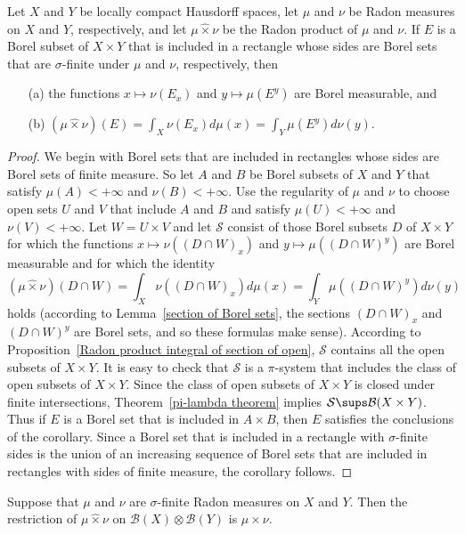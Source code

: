 \begin{proposition}\label{Radon product integral of section of sigma-finite edges}
Let $X$ and $Y$ be locally compact Hausdorff spaces, let $\mu$ and $\nu$ be Radon measures on $X$ and $Y$, respectively, and let $\mu\hat{\times}\nu$ be the Radon product of $\mu$ and $\nu$. If $E$ is a Borel subset of $X\times Y$ that is included in a rectangle whose sides are Borel sets that
are $\sigma$-finite under $\mu$ and $\nu$, respectively, then
\begin{itemize}
\item[(a)] the functions $x\mapsto\nu(E_x)$ and $y\mapsto\mu(E^y)$ are Borel measurable, and
\item[(b)] $(\mu\hat{\times}\nu)(E)=\int_X\nu(E_x)d\mu(x)=\int_Y\mu(E^y)d\nu(y)$.
\end{itemize}
\end{proposition}
\begin{proof}
We begin with Borel sets that are included in rectangles whose sides are
Borel sets of finite measure. So let $A$ and $B$ be Borel subsets of $X$ and $Y$ that satisfy $\mu(A)<+\infty$ and $\nu(B)<+\infty$. Use the regularity of $\mu$ and $\nu$ to choose open sets $U$ and $V$ that include $A$ and $B$ and satisfy $\mu(U)<+\infty$ and $\nu(V)<+\infty$. Let $W=U\times V$ and let $\mathcal{S}$ consist of those Borel subsets $D$ of $X\times Y$ for which the functions $x\mapsto\nu((D\cap W)_x)$ and $y\mapsto\mu((D\cap W)^y)$ are Borel measurable and for which the identity
\[(\mu\hat{\times}\nu)(D\cap W)=\int_X\nu((D\cap W)_x)d\mu(x)=\int_Y\mu((D\cap W)^y)d\nu(y)\]
holds (according to Lemma~\ref{section of Borel sets}, the sections $(D\cap W)_x$ and $(D\cap W)^y$ are Borel sets, and so these formulas make sense). According to  Proposition~\ref{Radon product integral of section of open}, $\mathcal{S}$ contains all the open subsets of $X\times Y$. It is easy to check that $\mathcal{S}$ is a $\pi$-system that includes the class of open subsets of $X\times Y$. Since the class of open subsets of $X\times Y$ is closed under finite intersections, Theorem~\ref{pi-lambda theorem} implies $\mathcal{S}\sups\mathcal{B}(X\times Y)$. Thus if $E$ is a Borel set that is included in $A\times B$, then $E$ satisfies the conclusions of the corollary. Since a Borel set that is included in a rectangle with $\sigma$-finite sides is the union of an increasing sequence of Borel sets that are included in rectangles with sides of finite measure, the corollary follows.
\end{proof}
\begin{corollary}
Suppose that $\mu$ and $\nu$ are $\sigma$-finite Radon measures on $X$ and $Y$. Then the restriction of $\mu\hat{\times}\nu$ on $\mathcal{B}(X)\otimes\mathcal{B}(Y)$ is $\mu\times\nu$.
\end{corollary}
